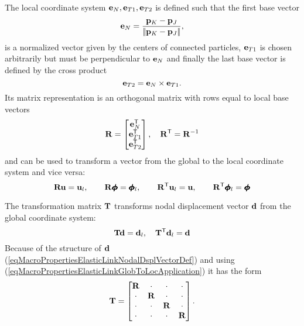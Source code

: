 The local coordinate system $\linkGlobToLocE_\normalComponent, \linkGlobToLocE_{\shearComponent1}, \linkGlobToLocE_{\shearComponent2}$
is defined such that the first base vector
\begin{equation}
	\linkGlobToLocE_\normalComponent = \frac{\particlePosition_\particleB-\particlePosition_\particleA}{\norm{\particlePosition_\particleB-\particlePosition_\particleA}}
	,
\end{equation}
is a normalized vector given by the centers of connected particles,
$\linkGlobToLocE_{\shearComponent1}$ is chosen arbitrarily but must be perpendicular to $\linkGlobToLocE_\normalComponent$
and finally the last base vector is defined by the cross product
\begin{equation}
	 \linkGlobToLocE_{\shearComponent2} = \linkGlobToLocE_\normalComponent \cross \linkGlobToLocE_{\shearComponent1}
	 .
\end{equation}
Its matrix representation is an orthogonal matrix with rows equal to local base vectors
\begin{equation}
	\linkGlobToLoc = \begin{bmatrix}
		\linkGlobToLocE_\normalComponent\T \\
		\linkGlobToLocE_{\shearComponent1}\T \\
		\linkGlobToLocE_{\shearComponent2}\T
	\end{bmatrix},
	\quad
	\linkGlobToLoc\T=\linkGlobToLoc\inv
\end{equation}
and can be used to transform a vector from the global to the local coordinate system and vice versa:
\begin{equation}
	\linkGlobToLoc\displacementVector = \displacementVector_\lcs
	,\qquad
	\linkGlobToLoc\rotationVector = \rotationVector_\lcs
	,\qquad
	\linkGlobToLoc\T\displacementVector_\lcs = \displacementVector
	,\qquad
	\linkGlobToLoc\T\rotationVector_\lcs = \rotationVector
	\label{eqMacroPropertiesElasticLinkGlobToLocApplication}
\end{equation}

The transformation matrix $\linkTrsfMat$ transforms nodal displacement vector $\linkNodalDsplVector$ from the global coordinate system:
\begin{equation}
	\linkTrsfMat\linkNodalDsplVector = \linkNodalDsplVector_\lcs
	,\quad
	\linkTrsfMat\T\linkNodalDsplVector_\lcs = \linkNodalDsplVector
	\label{eqMacroPropertiesElasticLinkTrsfMatApplication}
\end{equation}
Because of the structure of $\linkNodalDsplVector$ (\ref{eqMacroPropertiesElasticLinkNodalDsplVectorDef}) and using (\ref{eqMacroPropertiesElasticLinkGlobToLocApplication}) it has the form
\begin{equation}
	\linkTrsfMat = \begin{bmatrix}
		\linkGlobToLoc & \cdot & \cdot & \cdot \\
		\cdot & \linkGlobToLoc & \cdot & \cdot \\
		\cdot & \cdot & \linkGlobToLoc & \cdot \\
		\cdot & \cdot & \cdot & \linkGlobToLoc
	\end{bmatrix}
	.
\end{equation}


